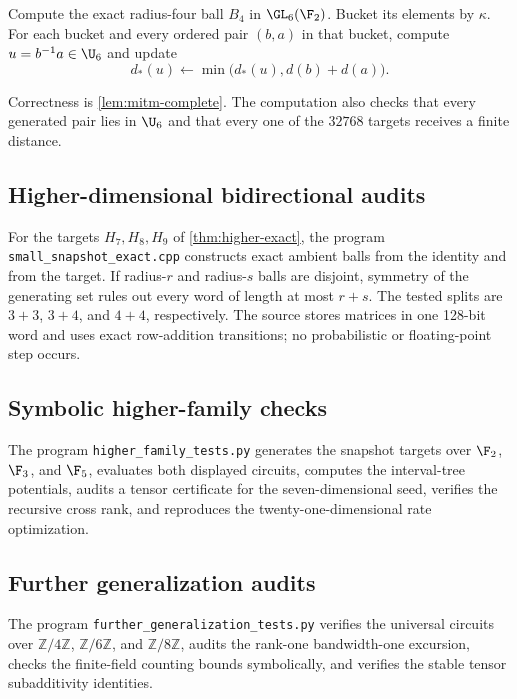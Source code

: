 \begin{algorithm}
Compute the exact radius-four ball $B_4$ in $\GL_6(\F_2)$.  Bucket its elements by $\kappa$.  For each bucket and every ordered pair $(b,a)$ in that bucket, compute $u=b^{-1}a\in\U_6$ and update
\[
d_*(u)\leftarrow
\min\bigl(d_*(u),d(b)+d(a)\bigr).
\]
\end{algorithm}

Correctness is \cref{lem:mitm-complete}.  The computation also checks that every generated pair lies in $\U_6$ and that every one of the $32768$ targets receives a finite distance.

\subsection{Higher-dimensional bidirectional audits}

For the targets $H_7,H_8,H_9$ of \cref{thm:higher-exact}, the program \texttt{small\_snapshot\_exact.cpp} constructs exact ambient balls from the identity and from the target.  If radius-$r$ and radius-$s$ balls are disjoint, symmetry of the generating set rules out every word of length at most $r+s$.  The tested splits are $3+3$, $3+4$, and $4+4$, respectively.  The source stores matrices in one 128-bit word and uses exact row-addition transitions; no probabilistic or floating-point step occurs.

\subsection{Symbolic higher-family checks}

The program \texttt{higher\_family\_tests.py} generates the snapshot targets over $\F_2$, $\F_3$, and $\F_5$, evaluates both displayed circuits, computes the interval-tree potentials, audits a tensor certificate for the seven-dimensional seed, verifies the recursive cross rank, and reproduces the twenty-one-dimensional rate optimization.

\subsection{Further generalization audits}

The program \texttt{further\_generalization\_tests.py} verifies the universal circuits over $\mathbb Z/4\mathbb Z$, $\mathbb Z/6\mathbb Z$, and $\mathbb Z/8\mathbb Z$, audits the rank-one bandwidth-one excursion, checks the finite-field counting bounds symbolically, and verifies the stable tensor subadditivity identities.

